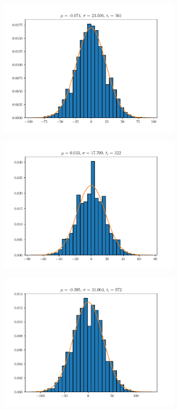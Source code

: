 \documentclass{article}
\begin{document}
\begin{figure}
\begin{subfigure}{.3\textwidth}
  \centering
  \includegraphics[width=1.1\linewidth]{hist10.pdf}
\end{subfigure}
\begin{subfigure}{.3\textwidth}
  \centering
  \includegraphics[width=1.1\linewidth]{hist11.pdf}
\end{subfigure}
\begin{subfigure}{.3\textwidth}
  \centering
  \includegraphics[width=1.1\linewidth]{hist12.pdf}

\end{subfigure}
\end{figure}
\end{document}
